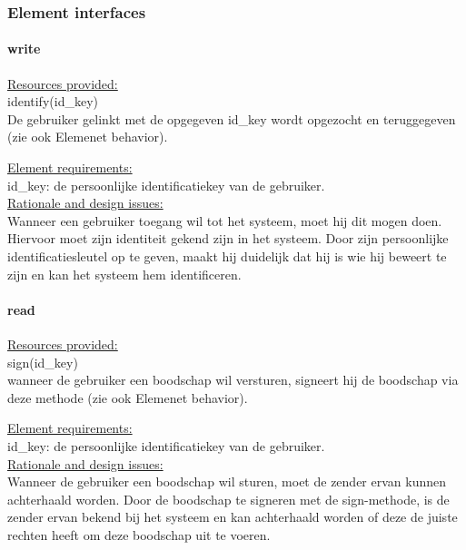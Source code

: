 \documentclass[a4paper,10pt]{article}
\begin{document}
\subsubsection{Element interfaces}
\paragraph{write}

\underline{Resources provided:}\\
identify(id\_key)\\
De gebruiker gelinkt met de opgegeven id\_key wordt opgezocht en teruggegeven (zie ook Elemenet behavior).

\underline{Element requirements:}\\
id\_key: de persoonlijke identificatiekey van de gebruiker.\\

\underline{Rationale and design issues:}\\
Wanneer een gebruiker toegang wil tot het systeem, moet hij dit mogen doen. Hiervoor moet zijn identiteit gekend zijn in het systeem. Door zijn persoonlijke identificatiesleutel op te geven, maakt hij duidelijk dat hij is wie hij beweert te zijn en kan het systeem hem identificeren.\\

\paragraph{read}

\underline{Resources provided:}\\
sign(id\_key)\\
wanneer de gebruiker een boodschap wil versturen, signeert hij de boodschap via deze methode (zie ook Elemenet behavior).

\underline{Element requirements:}\\
id\_key: de persoonlijke identificatiekey van de gebruiker.\\

\underline{Rationale and design issues:}\\
Wanneer de gebruiker een boodschap wil sturen, moet de zender ervan kunnen achterhaald worden. Door de boodschap te signeren met de sign-methode, is de zender ervan bekend bij het systeem en kan achterhaald worden of deze de juiste rechten heeft om deze boodschap uit te voeren.\\
\end{document}
